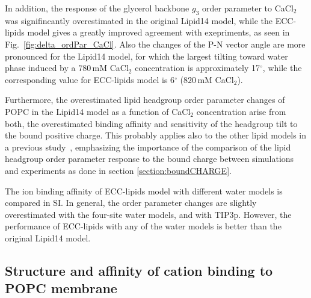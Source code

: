 \documentclass[aip,jcp,twocolumn]{revtex4}
\begin{document}
In addition, the response of the glycerol backbone $g_3$ order parameter to CaCl$_2$ was
signifincantly overestimated in the original Lipid14 model, while the ECC-lipids model
gives a greatly improved agreement with exepriments, as seen in Fig.~\ref{fig:delta_ordPar_CaCl}.
Also the changes of the P-N vector angle are more pronounced
for the Lipid14 model, for which the largest tilting toward water phase 
induced by a $780\,\mathrm{mM}$ CaCl$_2$ concentration
is approximately 17$^{\circ}$, while the corresponding
value for ECC-lipids model is 6$^{\circ}$ ($820\,\mathrm{mM}$ CaCl$_2$).

Furthermore, the overestimated lipid headgroup order parameter changes of POPC in the Lipid14
model as a function of CaCl$_2$ concentration arise from both, the overestimated
binding affinity and sensitivity of the headgroup tilt to the bound positive charge.
This probably applies also to the other lipid models in a previous study~\cite{catte16},
emphasizing the importance of the comparison of the lipid headgroup order parameter response
to the bound charge between simulations and experiments as done in section \ref{section:boundCHARGE}.

The ion binding affinity of ECC-lipids model with different water models is compared in SI. 
In general, the order parameter changes are slightly overestimated
with the four-site water models, and with TIP3p.
However, the performance of ECC-lipids with any of the water models 
is better than the original Lipid14 model. 







\subsection{Structure and affinity of cation binding to POPC membrane}
\label{sec:affinity}
\end{document}
